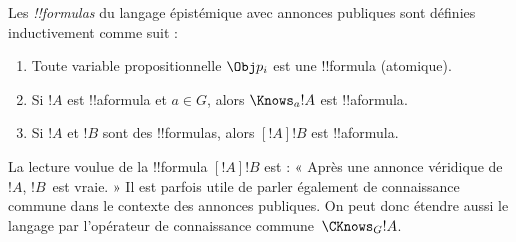 \documentclass[../../../include/open-logic-section]{subfiles}
\begin{document}
\begin{defn}
  Les \emph{!!{formula}s} du langage épistémique avec
  annonces publiques sont définies inductivement comme suit :
  \begin{enumerate}


  \item Toute variable propositionnelle $\Obj p_i$ est une
  !!{formula} (atomique).






  \item Si $!A$ est !!a{formula} et $a \in G$, alors $\Knows_a !A$ est
  !!a{formula}.

  \item Si $!A$ et $!B$ sont des !!{formula}s, alors $[!A] !B$ est !!a{formula}.

\end{enumerate}
\end{defn}

La lecture voulue de la !!{formula} $[!A] !B$ est : « Après une annonce
véridique de $!A$, $!B$~est vraie. » Il est parfois utile de parler
également de connaissance commune dans le contexte des annonces
publiques. On peut donc étendre aussi le langage par l'opérateur de
connaissance commune~$\CKnows_G
!A$.
\end{document}
